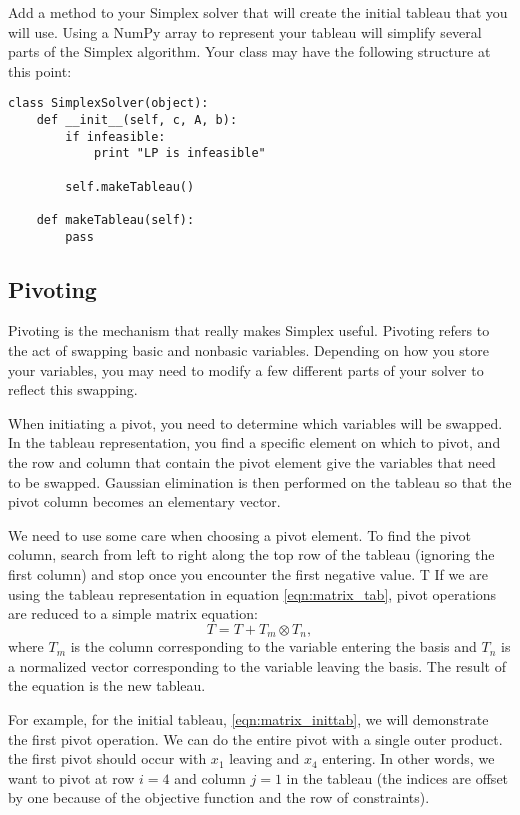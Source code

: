 \begin{problem}
Add a method to your Simplex solver that will create the initial tableau that you will use.
Using a NumPy array to represent your tableau will simplify several parts of the Simplex algorithm.
Your class may have the following structure at this point:
\begin{lstlisting}
class SimplexSolver(object):
    def __init__(self, c, A, b):
        if infeasible:
            print "LP is infeasible"

        self.makeTableau()

    def makeTableau(self):
        pass
\end{lstlisting}
\label{prob:maketableau}
\end{problem}

\subsection{Pivoting}
Pivoting is the mechanism that really makes Simplex useful.
Pivoting refers to the act of swapping basic and nonbasic variables.
Depending on how you store your variables, you may need to modify a few different parts of your solver to reflect this swapping.

When initiating a pivot, you need to determine which variables will be swapped.
In the tableau representation, you find a specific element on which to pivot, and the row and column that contain the pivot
element give the variables that need to be swapped.
Gaussian elimination is then performed on the tableau so that the pivot column becomes an elementary vector.

We need to use some care when choosing a pivot element. To find the pivot column, search from left to right along the top row of the tableau
(ignoring the first column) and stop once you encounter the first negative value. T
If we are using the tableau representation in equation \ref{eqn:matrix_tab}, pivot operations are reduced to a simple matrix equation:
\[T = T + T_m \otimes T_n,\]
where $T_m$ is the column corresponding to the variable entering the basis and $T_n$ is a normalized vector corresponding to the variable leaving the basis.  The result of the equation is the new tableau.

For example, for the initial tableau, \ref{eqn:matrix_inittab}, we will demonstrate the first pivot operation.
We can do the entire pivot with a single outer product.
the first pivot should occur with $x_1$ leaving and $x_4$ entering.
In other words, we want to pivot at row $i = 4$ and column $j = 1$ in the tableau (the indices are offset by one because of the objective function and the row of constraints).

